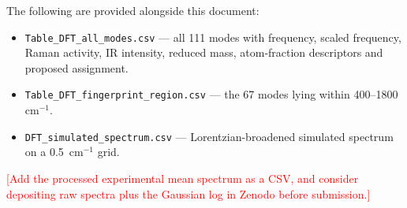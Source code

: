 \documentclass[11pt,a4paper]{article}
\newcommand{\wn}{\ensuremath{\mathrm{cm}^{-1}}}
\newcommand{\authorcheck}[1]{\textcolor{red}{[#1]}}
\begin{document}
The following are provided alongside this document:

\begin{itemize}
\item \texttt{Table\_DFT\_all\_modes.csv} --- all 111 modes with frequency,
scaled frequency, Raman activity, IR intensity, reduced mass, atom-fraction
descriptors and proposed assignment.
\item \texttt{Table\_DFT\_fingerprint\_region.csv} --- the 67 modes lying
within 400--1800~\wn{}.
\item \texttt{DFT\_simulated\_spectrum.csv} --- Lorentzian-broadened simulated
spectrum on a 0.5~\wn{} grid.
\end{itemize}

\authorcheck{Add the processed experimental mean spectrum as a CSV, and consider
depositing raw spectra plus the Gaussian log in Zenodo before submission.}
\end{document}
